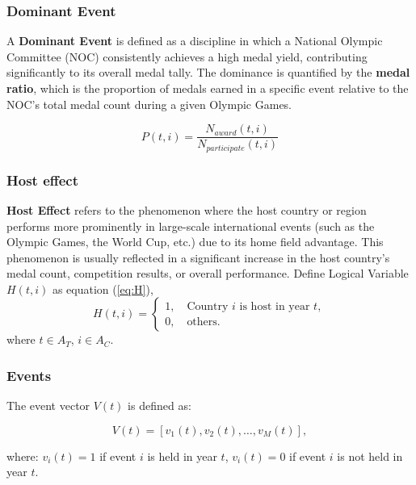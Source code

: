 \documentclass{mcmthesis}
\begin{document}
\subsubsection{Dominant Event}

A \textbf{Dominant Event} is defined as a discipline in which a National Olympic Committee (NOC) consistently achieves a high medal yield, contributing significantly to its overall medal tally. The dominance is quantified by the \textbf{medal ratio}, which is the proportion of medals earned in a specific event relative to the NOC's total medal count during a given Olympic Games.


\begin{equation*}
P(t,i)=\frac{ N_{award}(t,i) }{ N_{participate}(t,i) }
\end{equation*}


\subsubsection{Host effect}

\textbf{Host Effect} refers to the phenomenon where the host country or region performs more prominently in large-scale international events (such as the Olympic Games, the World Cup, etc.) due to its home field advantage. This phenomenon is usually reflected in a significant increase in the host country's medal count, competition results, or overall performance. Define Logical Variable $H(t,i)$ as equation (\ref{eq:H}),
\begin{equation}
H(t,i)=
\begin{cases}
1, \quad \text{Country } i \text{ is host in year } t, \\
0, \quad \text{others}.
\end{cases}
\label{eq:H}
\end{equation}
where $t\in A_{T}$, $i\in A_{C}$.



\subsubsection{Events}
The event vector \( V(t) \) is defined as:

\[
V(t) = [v_1(t), v_2(t), \dots, v_M(t)],
\]

where: \( v_i(t) = 1 \) if event \( i \) is held in year \( t \),
 \( v_i(t) = 0 \) if event \( i \) is not held in year \( t \).
\end{document}
